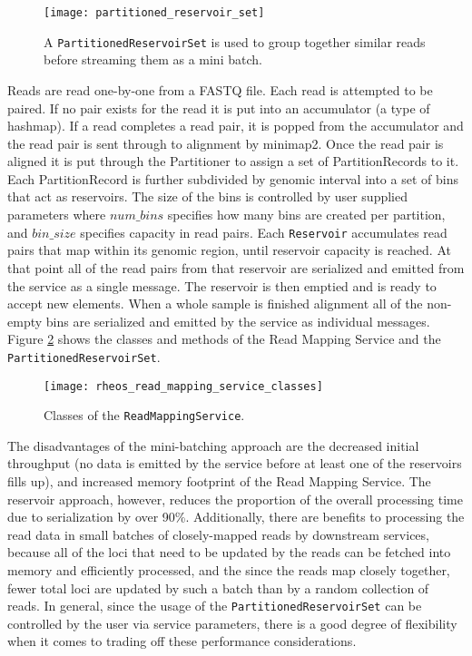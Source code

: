 \begin{figure}[h!]
    \texttt{[image: partitioned\_reservoir\_set]}
    \centering
    \caption {A \texttt{PartitionedReservoirSet} is used to group together similar reads before streaming them as a mini batch.}
    \label{fig:partitioned_reservoir_set}
\end{figure}

Reads are read one-by-one from a FASTQ file. Each read is attempted to be paired. If no pair exists for the read it is put into an accumulator (a type of hashmap). If a read completes a read pair, it is popped from the accumulator and the read pair is sent through to alignment by minimap2. Once the read pair is aligned it is put through the Partitioner to assign a set of PartitionRecords to it. Each PartitionRecord is further subdivided by genomic interval into a set of bins that act as reservoirs. The size of the bins is controlled by user supplied parameters where $num\_bins$ specifies how many bins are created per partition, and $bin\_size$ specifies capacity in read pairs. Each \texttt{Reservoir} accumulates read pairs that map within its genomic region, until reservoir capacity is reached. At that point all of the read pairs from that reservoir are serialized and emitted from the service as a single message. The reservoir is then emptied and is ready to accept new elements. When a whole sample is finished alignment all of the non-empty bins are serialized and emitted by the service as individual messages. Figure \ref{fig:rheos_read_mapping_service_classes} shows the classes and methods of the Read Mapping Service and the \texttt{PartitionedReservoirSet}.

\begin{figure}[h!]
    \texttt{[image: rheos\_read\_mapping\_service\_classes]}
    \centering
    \caption {Classes of the \texttt{ReadMappingService}.}
    \label{fig:rheos_read_mapping_service_classes}
\end{figure}

The disadvantages of the mini-batching approach are the decreased initial throughput (no data is emitted by the service before at least one of the reservoirs fills up), and increased memory footprint of the Read Mapping Service. The reservoir approach, however, reduces the proportion of the overall processing time due to serialization by over 90\%. Additionally, there are benefits to processing the read data in small batches of closely-mapped reads by downstream services, because all of the loci that need to be updated by the reads can be fetched into memory and efficiently processed, and the since the reads map closely together, fewer total loci are updated by such a batch than by a random collection of reads. In general, since the usage of the \texttt{PartitionedReservoirSet} can be controlled by the user via service parameters, there is a good degree of flexibility when it comes to trading off these performance considerations.

